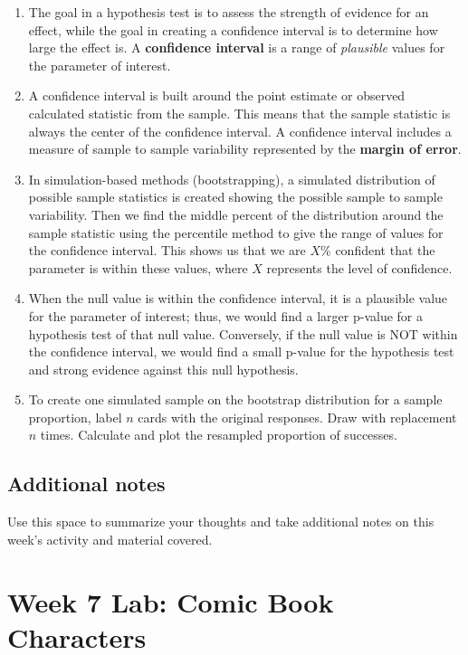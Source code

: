 \documentclass[
]{report}
\begin{document}
\begin{enumerate}
\def\labelenumi{\arabic{enumi}.}
\item
  The goal in a hypothesis test is to assess the strength of evidence for an effect, while the goal in creating a confidence interval is to determine how large the effect is. A \textbf{confidence interval} is a range of \emph{plausible} values for the parameter of interest.
\item
  A confidence interval is built around the point estimate or observed calculated statistic from the sample. This means that the sample statistic is always the center of the confidence interval. A confidence interval includes a measure of sample to sample variability represented by the \textbf{margin of error}.
\item
  In simulation-based methods (bootstrapping), a simulated distribution of possible sample statistics is created showing the possible sample to sample variability. Then we find the middle percent of the distribution around the sample statistic using the percentile method to give the range of values for the confidence interval. This shows us that we are \(X\)\% confident that the parameter is within these values, where \(X\) represents the level of confidence.
\item
  When the null value is within the confidence interval, it is a plausible value for the parameter of interest; thus, we would find a larger p-value for a hypothesis test of that null value. Conversely, if the null value is NOT within the confidence interval, we would find a small p-value for the hypothesis test and strong evidence against this null hypothesis.
\item
  To create one simulated sample on the bootstrap distribution for a sample proportion, label \(n\) cards with the original responses. Draw with replacement \(n\) times. Calculate and plot the resampled proportion of successes.
\end{enumerate}

\hypertarget{additional-notes-8}{%
\subsection{Additional notes}\label{additional-notes-8}}

Use this space to summarize your thoughts and take additional notes on this week's activity and material covered.

\newpage

\hypertarget{week-7-lab-comic-book-characters}{%
\section{Week 7 Lab: Comic Book Characters}\label{week-7-lab-comic-book-characters}}
\end{document}
